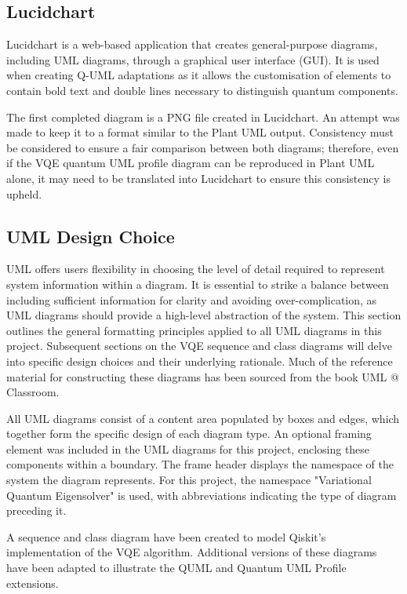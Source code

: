 \documentclass{article}
\begin{document}
\subsection{Lucidchart}

Lucidchart is a web-based application that creates general-purpose diagrams, including UML diagrams, through a graphical user interface (GUI). It is used when creating Q-UML adaptations as it allows the customisation of elements to contain bold text and double lines necessary to distinguish quantum components. 

The first completed diagram is a PNG file created in Lucidchart. An attempt was made to keep it to a format similar to the Plant UML output. Consistency must be considered to ensure a fair comparison between both diagrams; therefore, even if the VQE quantum UML profile diagram can be reproduced in Plant UML alone, it may need to be translated into Lucidchart to ensure this consistency is upheld.

\subsection{UML Design Choice}

UML offers users flexibility in choosing the level of detail required to represent system information within a diagram. It is essential to strike a balance between including sufficient information for clarity and avoiding over-complication, as UML diagrams should provide a high-level abstraction of the system. This section outlines the general formatting principles applied to all UML diagrams in this project. Subsequent sections on the VQE sequence and class diagrams will delve into specific design choices and their underlying rationale. Much of the reference material for constructing these diagrams has been sourced from the book UML @ Classroom\cite{Seidl_Scholz_Huemer_Kappel_Duffy_2014}. 

All UML diagrams consist of a content area populated by boxes and edges, which together form the specific design of each diagram type. An optional framing element was included in the UML diagrams for this project, enclosing these components within a boundary. The frame header displays the namespace of the system the diagram represents\cite{UMLElementFrame}. For this project, the namespace "Variational Quantum Eigensolver" is used, with abbreviations indicating the type of diagram preceding it. 

A sequence and class diagram have been created to model Qiskit’s implementation of the VQE algorithm. Additional versions of these diagrams have been adapted to illustrate the QUML and Quantum UML Profile extensions.
\end{document}
